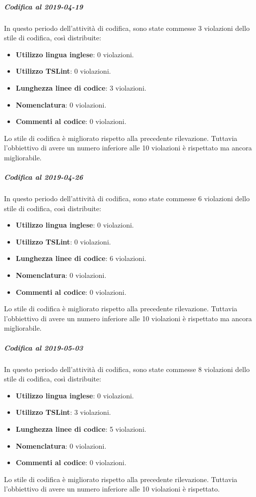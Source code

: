 \subparagraph{Codifica al 2019-04-19}
In questo periodo dell'attività di codifica, sono state commesse 3 violazioni dello stile di codifica, così distribuite:
 \begin{itemize}
 	\item \textbf{Utilizzo lingua inglese}: 0 violazioni.
 	\item \textbf{Utilizzo TSLint}: 0 violazioni.
 	\item \textbf{Lunghezza linee di codice}: 3 violazioni.
 	\item \textbf{Nomenclatura}: 0 violazioni.
 	\item \textbf{Commenti al codice}: 0 violazioni.
 \end{itemize}
Lo stile di codifica è migliorato rispetto alla precedente rilevazione. Tuttavia l'obbiettivo di avere un numero inferiore alle 10 violazioni è rispettato ma ancora migliorabile.

\subparagraph{Codifica al 2019-04-26}
In questo periodo dell'attività di codifica, sono state commesse 6 violazioni dello stile di codifica, così distribuite:
 \begin{itemize}
 	\item \textbf{Utilizzo lingua inglese}: 0 violazioni.
 	\item \textbf{Utilizzo TSLint}: 0 violazioni.
 	\item \textbf{Lunghezza linee di codice}: 6 violazioni.
 	\item \textbf{Nomenclatura}: 0 violazioni.
 	\item \textbf{Commenti al codice}: 0 violazioni.
 \end{itemize}
Lo stile di codifica è migliorato rispetto alla precedente rilevazione. Tuttavia l'obbiettivo di avere un numero inferiore alle 10 violazioni è rispettato ma ancora migliorabile.

\subparagraph{Codifica al 2019-05-03}
In questo periodo dell'attività di codifica, sono state commesse 8 violazioni dello stile di codifica, così distribuite:
 \begin{itemize}
 	\item \textbf{Utilizzo lingua inglese}: 0 violazioni.
 	\item \textbf{Utilizzo TSLint}: 3 violazioni.
 	\item \textbf{Lunghezza linee di codice}: 5 violazioni.
 	\item \textbf{Nomenclatura}: 0 violazioni.
 	\item \textbf{Commenti al codice}: 0 violazioni.
 \end{itemize}
Lo stile di codifica è migliorato rispetto alla precedente rilevazione. Tuttavia l'obbiettivo di avere un numero inferiore alle 10 violazioni è rispettato.

